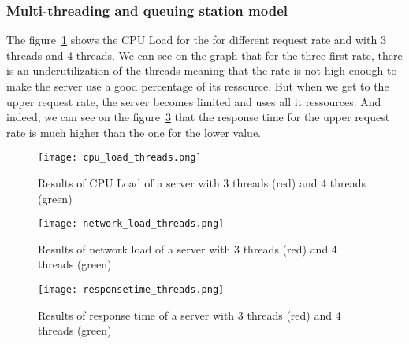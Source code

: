\subsubsection{Multi-threading and queuing station model}
\label{subs:Multi-threading and queuing station model}
The figure~\ref{fig:cpuload_threads} shows the CPU Load for the for different request rate and
with 3 threads and 4 threads. We can see on the graph that for the three first rate, there is an
underutilization of the threads meaning that the rate is not high enough to make the server use
a good percentage of its ressource. But when we get to the upper request rate, the server becomes
limited and uses all it ressources. And indeed, we can see on the figure~\ref{fig:responsetime_threads}
that the response time for the upper request rate is much higher than the one for the lower value.


\begin{figure}[!ht]
    \centering
    \texttt{[image: cpu\_load\_threads.png]}
    \caption{Results of CPU Load of a server with 3 threads (red) and 4 threads (green)}
    \label{fig:cpuload_threads}
\end{figure}

\begin{figure}[!ht]
    \centering
    \texttt{[image: network\_load\_threads.png]}
    \caption{Results of network load of a server with 3 threads (red) and 4 threads (green)}
    \label{fig:network_threads}
\end{figure}

\begin{figure}[!ht]
    \centering
    \texttt{[image: responsetime\_threads.png]}
    \caption{Results of response time of a server with 3 threads (red) and 4 threads (green)}
    \label{fig:responsetime_threads}
\end{figure}
